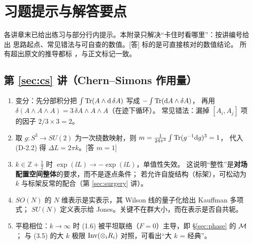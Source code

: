 \section{习题提示与解答要点}\label{app:exercises}

各讲章末已给出练习与部分行内提示。本附录只解决“卡住时看哪里”：按讲编号给出
思路起点、常见错法与可自查的数值。[答] 标的是可直接核对的数值结论。
所有超出原文的推导都标 \ours，与正文标记一致。

\subsection*{第 \ref{sec:cs} 讲（Chern--Simons 作用量）}
\begin{enumerate}[leftmargin=*]
  \item 变分：先分部积分把 $\int\operatorname{Tr}(A\wedge\mathrm{d}\,\delta A)$ 写成 $-\int\operatorname{Tr}(\mathrm{d} A\wedge\delta A)$，
        再用 $\delta(A\wedge A\wedge A)=3\,\delta A\wedge A\wedge A$（在迹下循环）。
        常见错法：漏掉 $[A_i,A_j]$ 项的因子 $2/3\times3=2$。
  \item 取 $g:S^3\to SU(2)$ 为一次绕数映射，则 $m=\frac{1}{24\pi^2}\int\operatorname{Tr}(g^{-1}\mathrm{d} g)^3=1$，
        代入 (D-2.2) 得 $\Delta L=2\pi k$。\hfill[答 $m=1$]
  \item $k\in\mathbb Z+\frac12$ 时 $\exp(\ii L)\to-\exp(\ii L)$，单值性失效。
        这说明“整性”是\textbf{对场配置空间整体}的要求，而不是逐点条件；
        若允许自旋结构（标架），可松动为 $k$ 与标架反常的配合（第 \ref{sec:surgery} 讲）。
  \item $SO(N)$ 的 $N$ 维表示是实表示，其 Wilson 线的量子化给出 Kauffman 多项式；
        $SU(N)$ 定义表示给 Jones。关键不在群大小，而在表示是否自共轭。
  \item 平稳相位：$k\to\infty$ 时 (1.6) 被平坦联络（$F=0$）主导，即 §\ref{sec:phase} 的 $\mathcal{M}$；
        与 (3.5) 的大 $k$ 极限 $\operatorname{Inv}(\otimes_iR_i)$ 对照，可看出“大 $k$ = 经典”。
\end{enumerate}


